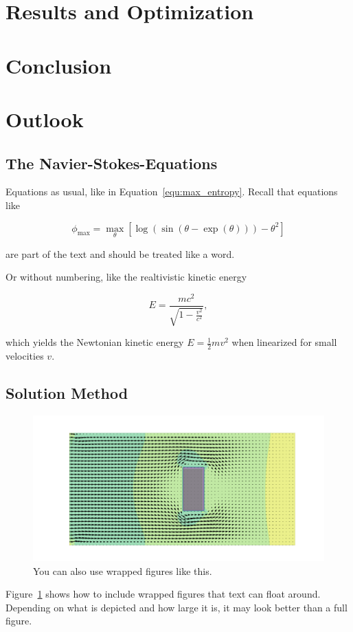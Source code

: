 \documentclass[11pt,table]{article}
\begin{document}
\section{Results and Optimization}
\section{Conclusion}
\section{Outlook}

\subsection{The Navier-Stokes-Equations}

Equations as usual, like in Equation~\ref{equ:max_entropy}. Recall that equations like

\begin{equation}\label{equ:max_entropy}
	\phi_\mathrm{max} = \max_{\theta} \left[ \log(\sin(\theta - \exp(\theta))) - \theta^2 \right]
\end{equation}

are part of the text and should be treated like a word.


Or without numbering, like the realtivistic kinetic energy 

\begin{equation*}
	E = \frac{mc^2}{\sqrt{1 - \frac{v^2}{c^2}}},
\end{equation*}

which yields the Newtonian kinetic energy $E = \frac 1 2 m v^2$ when linearized for small velocities $v$.

\subsection{Solution Method}
\begin{figure}
	\centering
	\includegraphics[scale=1.0]{Figures/example_cover.png}
	\caption{You can also use wrapped figures like this.}
	\label{fig:wrapfigure_example}
\end{figure}
Figure~\ref{fig:wrapfigure_example} shows how to include wrapped figures that text can float around. Depending on what is depicted and how large it is, it may look better than a full figure.
\end{document}
